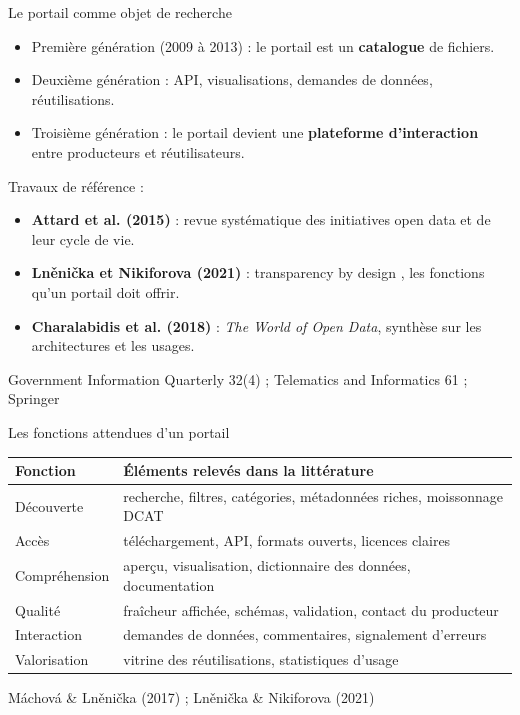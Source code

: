 \documentclass[11pt,aspectratio=169]{beamer}
\newcommand{\refc}[1]{\textcolor{gris}{\footnotesize #1}}
\begin{document}
\begin{frame}{Le portail comme objet de recherche}
  \begin{itemize}
    \item Première génération (2009 à 2013) : le portail est un \textbf{catalogue} de fichiers.
    \item Deuxième génération : API, visualisations, demandes de données, réutilisations.
    \item Troisième génération : le portail devient une \textbf{plateforme d'interaction} entre producteurs et réutilisateurs.
  \end{itemize}
  \vspace{0.6em}
  Travaux de référence :
  \begin{itemize}
    \small
    \item \textbf{Attard et al. (2015)} : revue systématique des initiatives open data et de leur cycle de vie.
    \item \textbf{Lněnička et Nikiforova (2021)} : \og transparency by design \fg{}, les fonctions qu'un portail doit offrir.
    \item \textbf{Charalabidis et al. (2018)} : \emph{The World of Open Data}, synthèse sur les architectures et les usages.
  \end{itemize}
  \vfill
  \refc{Government Information Quarterly 32(4) ; Telematics and Informatics 61 ; Springer}
\end{frame}

\begin{frame}{Les fonctions attendues d'un portail}
  \small
  \begin{tabularx}{\textwidth}{@{}lX@{}}
    \toprule
    \textbf{Fonction} & \textbf{Éléments relevés dans la littérature} \\
    \midrule
    Découverte & recherche, filtres, catégories, métadonnées riches, moissonnage DCAT \\
    Accès & téléchargement, API, formats ouverts, licences claires \\
    Compréhension & aperçu, visualisation, dictionnaire des données, documentation \\
    Qualité & fraîcheur affichée, schémas, validation, contact du producteur \\
    Interaction & demandes de données, commentaires, signalement d'erreurs \\
    Valorisation & vitrine des réutilisations, statistiques d'usage \\
    \bottomrule
  \end{tabularx}
  \vfill
  \refc{Máchová \& Lněnička (2017) ; Lněnička \& Nikiforova (2021)}
\end{frame}
\end{document}
